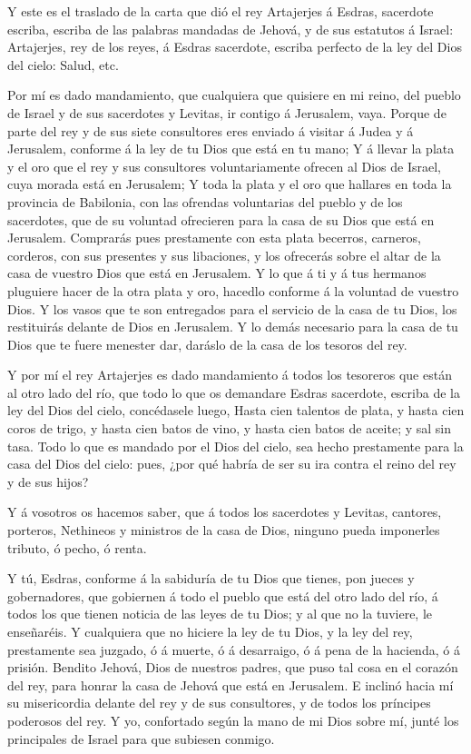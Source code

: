  Y este es el traslado de la carta que dió el rey
Artajerjes á Esdras, sacerdote escriba, escriba de las palabras mandadas
de Jehová, y de sus estatutos á Israel:  Artajerjes, rey de
los reyes, á Esdras sacerdote, escriba perfecto de la ley del Dios del
cielo: Salud, etc.

 Por mí es dado mandamiento, que cualquiera que quisiere en
mi reino, del pueblo de Israel y de sus sacerdotes y Levitas, ir contigo
á Jerusalem, vaya.  Porque de parte del rey y de sus siete
consultores eres enviado á visitar á Judea y á Jerusalem, conforme á la
ley de tu Dios que está en tu mano;  Y á llevar la plata y
el oro que el rey y sus consultores voluntariamente ofrecen al Dios de
Israel, cuya morada está en Jerusalem;  Y toda la plata y
el oro que hallares en toda la provincia de Babilonia, con las ofrendas
voluntarias del pueblo y de los sacerdotes, que de su voluntad
ofrecieren para la casa de su Dios que está en Jerusalem. 
Comprarás pues prestamente con esta plata becerros, carneros, corderos,
con sus presentes y sus libaciones, y los ofrecerás sobre el altar de la
casa de vuestro Dios que está en Jerusalem.  Y lo que á ti
y á tus hermanos pluguiere hacer de la otra plata y oro, hacedlo
conforme á la voluntad de vuestro Dios.  Y los vasos que te
son entregados para el servicio de la casa de tu Dios, los restituirás
delante de Dios en Jerusalem.  Y lo demás necesario para la
casa de tu Dios que te fuere menester dar, daráslo de la casa de los
tesoros del rey.

 Y por mí el rey Artajerjes es dado mandamiento á todos los
tesoreros que están al otro lado del río, que todo lo que os demandare
Esdras sacerdote, escriba de la ley del Dios del cielo, concédasele
luego,  Hasta cien talentos de plata, y hasta cien coros de
trigo, y hasta cien batos de vino, y hasta cien batos de aceite; y sal
sin tasa.  Todo lo que es mandado por el Dios del cielo,
sea hecho prestamente para la casa del Dios del cielo: pues, ¿por qué
habría de ser su ira contra el reino del rey y de sus hijos?

 Y á vosotros os hacemos saber, que á todos los sacerdotes
y Levitas, cantores, porteros, Nethineos y ministros de la casa de Dios,
ninguno pueda imponerles tributo, ó pecho, ó renta.

 Y tú, Esdras, conforme á la sabiduría de tu Dios que
tienes, pon jueces y gobernadores, que gobiernen á todo el pueblo que
está del otro lado del río, á todos los que tienen noticia de las leyes
de tu Dios; y al que no la tuviere, le enseñaréis.  Y
cualquiera que no hiciere la ley de tu Dios, y la ley del rey,
prestamente sea juzgado, ó á muerte, ó á desarraigo, ó á pena de la
hacienda, ó á prisión.  Bendito Jehová, Dios de nuestros
padres, que puso tal cosa en el corazón del rey, para honrar la casa de
Jehová que está en Jerusalem.  E inclinó hacia mí su
misericordia delante del rey y de sus consultores, y de todos los
príncipes poderosos del rey. Y yo, confortado según la mano de mi Dios
sobre mí, junté los principales de Israel para que subiesen conmigo.

